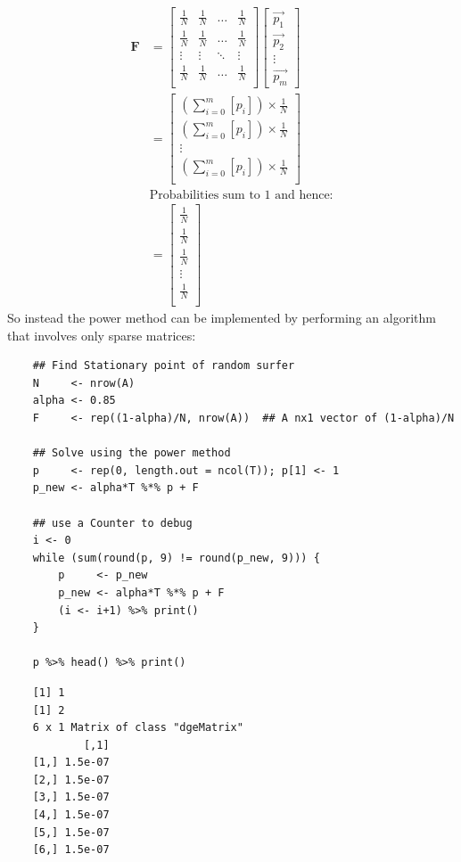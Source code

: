 \documentclass[11pt]{report}
\begin{document}
\begin{align}
\mathbf{F} &=
\begin{bmatrix}
\frac{1}{N} & \frac{1}{N} & \ldots & \frac{1}{N} \\
\frac{1}{N} & \frac{1}{N} & \ldots & \frac{1}{N} \\
\vdots      & \vdots      & \ddots & \vdots \\
\frac{1}{N} & \frac{1}{N} & \ldots & \frac{1}{N} \\
\end{bmatrix} \label{eq:bgVal2}
\begin{bmatrix}
\vec{p_1} \\ \vec{p_2} \\ \vdots \\ \vec{p_m}
\end{bmatrix}  \\
&= \begin{bmatrix}
\left( \sum^{m}_{i= 0}   \left[ p_i \right]  \right) \times \frac{1}{N} \\
\left( \sum^{m}_{i= 0}   \left[ p_i \right]  \right) \times \frac{1}{N} \\
\vdots  \\
\left( \sum^{m}_{i= 0}   \left[ p_i \right]  \right) \times \frac{1}{N} \\
\end{bmatrix}  \\
& \text{Probabilities sum to 1 and hence:} \\
&= \begin{bmatrix}
\frac{1}{N} \\
\frac{1}{N} \\
\frac{1}{N} \\
\vdots  \\
\frac{1}{N} \\
\end{bmatrix}
\end{align}
So instead the power method can be implemented by performing an algorithm that involves only sparse matrices:

\begin{tcolorbox}
    \begin{verbatim}
    ## Find Stationary point of random surfer
    N     <- nrow(A)
    alpha <- 0.85
    F     <- rep((1-alpha)/N, nrow(A))  ## A nx1 vector of (1-alpha)/N

    ## Solve using the power method
    p     <- rep(0, length.out = ncol(T)); p[1] <- 1
    p_new <- alpha*T %*% p + F

    ## use a Counter to debug
    i <- 0
    while (sum(round(p, 9) != round(p_new, 9))) {
        p     <- p_new
        p_new <- alpha*T %*% p + F
        (i <- i+1) %>% print()
    }

    p %>% head() %>% print()
    \end{verbatim}
\tcblower
    \begin{verbatim}
    [1] 1
    [1] 2
    6 x 1 Matrix of class "dgeMatrix"
            [,1]
    [1,] 1.5e-07
    [2,] 1.5e-07
    [3,] 1.5e-07
    [4,] 1.5e-07
    [5,] 1.5e-07
    [6,] 1.5e-07
    \end{verbatim}
\end{tcolorbox}
\end{document}
